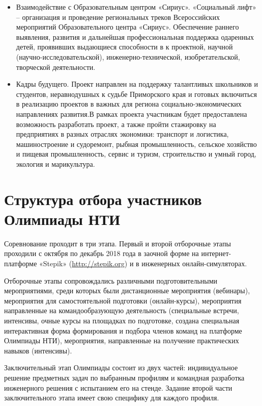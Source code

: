 \begin{enumerate}
\begin{itemize}
        \item Взаимодействие с Образовательным центром «Сириус». «Социальный лифт» – организация и проведение региональных треков Всероссийских мероприятий Образовательного центра «Сириус». Обеспечение раннего выявления, развития и дальнейшая профессиональная поддержка одаренных детей, проявивших выдающиеся способности в к проектной, научной (научно-исследовательской), инженерно-технической, изобретательской, творческой деятельности.
        \item Кадры будущего. Проект направлен на поддержку талантливых школьников и студентов, неравнодушных к судьбе Приморского края и готовых включиться в реализацию проектов в важных для региона социально-экономических направлениях развития.В рамках проекта участникам будет предоставлена возможность разработать проект, а также пройти стажировку на предприятиях в разных отраслях экономики: транспорт и логистика, машиностроение и судоремонт, рыбная промышленность, сельское хозяйство и пищевая промышленность, сервис и туризм, строительство и умный город, экология и марикультура.
    \end{itemize}
\end{enumerate}

\section*{Структура отбора участников Олимпиады НТИ}

Соревнование проходит в три этапа. Первый и второй отборочные этапы проходили с октября по декабрь 2018 года в заочной форме на интернет-платформе «Stepik» (\url{http://stepik.org}) и в инженерных онлайн-симуляторах.

Отборочные этапы сопровождались различными подготовительными мероприятиями, среди которых были дистанционные мероприятия (вебинары), мероприятия для самостоятельной подготовки (онлайн-курсы), мероприятия направленные на командообразующую деятельность (специальные встречи, интенсивы, очные курсы на площадках по подготовке, создана специальная интерактивная форма формирования и подбора членов команд на платформе Олимпиады НТИ), мероприятия, направленные на получение практических навыков (интенсивы).

Заключительный этап Олимпиады состоит из двух частей: индивидуальное решение предметных задач по выбранным профилям и командная разработка инженерного решения с испытанием  его на стенде. Задание второй части заключительного этапа имеет свою специфику для каждого профиля.

